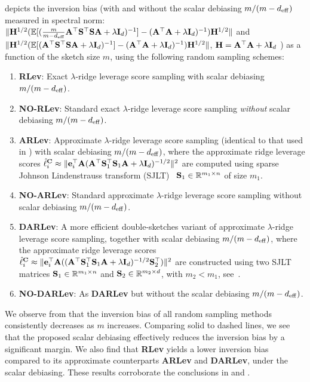 \documentclass[11pt,a4paper]{article}
\begin{document}
 depicts the inversion bias (with and without the scalar debiasing $m/(m-d_{\mathrm{eff}})$ measured in spectral norm:
$\|\mathbf{H}^{1/2}({\mathbb{E}}[(\frac{m}{m-d_{\mathrm{eff}}}\mathbf{A}^\top \mathbf{S}^\top\mathbf{S} \mathbf{A} + \lambda\mathbf{I}_d )^{-1}]-(\mathbf{A}^\top \mathbf{A} + \lambda\mathbf{I}_d )^{-1})\mathbf{H}^{1/2}\|$ and $\|\mathbf{H}^{1/2}({\mathbb{E}}[(\mathbf{A}^\top \mathbf{S}^\top\mathbf{S} \mathbf{A} + \lambda\mathbf{I}_d )^{-1}]-(\mathbf{A}^\top \mathbf{A} + \lambda\mathbf{I}_d )^{-1})\mathbf{H}^{1/2}\|$,  $\mathbf{H}=\mathbf{A}^\top \mathbf{A} + \lambda\mathbf{I}_d$ ) as a function of the sketch size $m$, using the following random sampling schemes:
\begin{enumerate}
    \item \textbf{RLev}: Exact $\lambda$-ridge leverage score sampling with scalar debiasing $m/(m-d_{\mathrm{eff}})$.
      \item \textbf{NO-RLev}: Standard exact $\lambda$-ridge leverage score sampling \emph{without} scalar debiasing $m/(m-d_{\mathrm{eff}})$.
     \item \textbf{ARLev}: Approximate $\lambda$-ridge leverage score sampling (identical to that used in ) with scalar debiasing $m/(m-d_{\mathrm{eff}})$, where the approximate ridge leverage scores $\hat \ell_i^{\mathbf{C}}\approx \|\mathbf{e}_i^\top\mathbf{A}(\mathbf{A}^\top\mathbf{S}_1^\top\mathbf{S}_1 \mathbf{A} + \lambda\mathbf{I}_d )^{-1/2}\|^2$  are computed using sparse Johnson Lindenstrauss transform (SJLT)~\citep{clarkson2017low} $\mathbf{S}_1\in{\mathbb{R}}^{m_1\times n }$ of size $m_1$.
      \item \textbf{NO-ARLev}: Standard approximate $\lambda$-ridge leverage score sampling without scalar debiasing $m/(m-d_{\mathrm{eff}})$.
      \item \textbf{DARLev}: A more efficient double-sketches variant of approximate $\lambda$-ridge leverage score sampling, together with  scalar debiasing $m/(m-d_{\mathrm{eff}})$, where the approximate ridge leverage scores $\hat \ell_i^{\mathbf{C}}\approx \|\mathbf{e}_i^\top\mathbf{A}((\mathbf{A}^\top\mathbf{S}_1^\top\mathbf{S}_1  \mathbf{A} + \lambda\mathbf{I}_d )^{-1/2}\mathbf{S}^\top_2)\|^2$ are constructed using two SJLT matrices $\mathbf{S}_1\in{\mathbb{R}}^{m_1 \times n }$ and $\mathbf{S}_2\in{\mathbb{R}}^{m_2 \times d }$, with $m_2<m_1$, see~\citep{drineas2012fast,cohen2017input}.
      \item \textbf{NO-DARLev}: As \textbf{DARLev} but without the scalar debiasing $m/(m-d_{\mathrm{eff}})$.
\end{enumerate}


We observe from  that the inversion bias of all random sampling methods consistently decreases as $m$ increases. 
Comparing solid to dashed lines, we see that the proposed scalar debiasing effectively reduces the inversion bias by a significant margin.
We also find that \textbf{RLev} yields a lower inversion bias compared to its approximate counterparts \textbf{ARLev} and \textbf{DARLev}, under the scalar debiasing.
These results corroborate the conclusions in  and .
\end{document}

